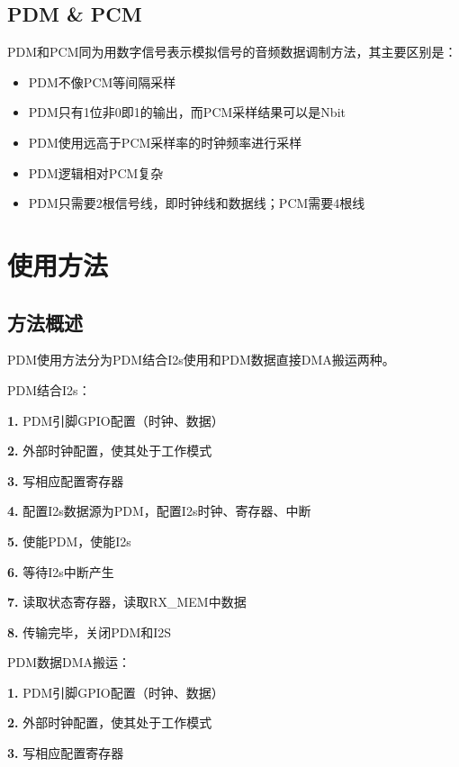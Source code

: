 \documentclass[
  12pt,
]{book}
\begin{document}
\hypertarget{pdm-pcm}{%
\subsection{PDM \& PCM}\label{pdm-pcm}}

PDM和PCM同为用数字信号表示模拟信号的音频数据调制方法，其主要区别是：

\begin{itemize}
\item
  PDM不像PCM等间隔采样
\item
  PDM只有1位非0即1的输出，而PCM采样结果可以是Nbit
\item
  PDM使用远高于PCM采样率的时钟频率进行采样
\item
  PDM逻辑相对PCM复杂
\item
  PDM只需要2根信号线，即时钟线和数据线；PCM需要4根线
\end{itemize}

\hypertarget{ux4f7fux7528ux65b9ux6cd5-2}{%
\section{使用方法}\label{ux4f7fux7528ux65b9ux6cd5-2}}

\hypertarget{ux65b9ux6cd5ux6982ux8ff0-2}{%
\subsection{方法概述}\label{ux65b9ux6cd5ux6982ux8ff0-2}}

PDM使用方法分为PDM结合I2s使用和PDM数据直接DMA搬运两种。

PDM结合I2s：

\textbf{1.} PDM引脚GPIO配置（时钟、数据）

\textbf{2.} 外部时钟配置，使其处于工作模式

\textbf{3.} 写相应配置寄存器

\textbf{4.} 配置I2s数据源为PDM，配置I2s时钟、寄存器、中断

\textbf{5.} 使能PDM，使能I2s

\textbf{6.} 等待I2s中断产生

\textbf{7.} 读取状态寄存器，读取RX\_MEM中数据

\textbf{8.} 传输完毕，关闭PDM和I2S

PDM数据DMA搬运：

\textbf{1.} PDM引脚GPIO配置（时钟、数据）

\textbf{2.} 外部时钟配置，使其处于工作模式

\textbf{3.} 写相应配置寄存器
\end{document}
